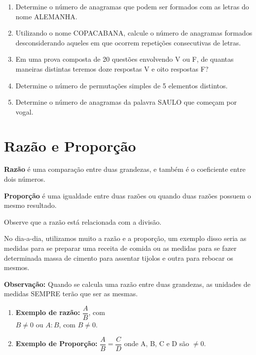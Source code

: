 \begin{multicols*}{2}
\begin{enumerate}
        \item Determine o número de anagramas que podem ser formados com as letras do nome ALEMANHA.

        \item Utilizando o nome COPACABANA, calcule o número de anagramas formados desconsiderando aqueles em que ocorrem repetições consecutivas de letras.

        \item Em uma prova composta de 20 questões envolvendo V ou F, de quantas maneiras distintas teremos doze respostas V e oito respostas F?

        \item Determine o número de permutações simples de 5 elementos distintos.

        \item Determine o número de anagramas da palavra SAULO que começam por vogal.

    \end{enumerate}

    \section*{Razão e Proporção}

    \textbf{Razão} é uma comparação entre duas grandezas, e também é o coeficiente entre dois números.

    \textbf{Proporção} é uma igualdade entre duas razões ou quando duas razões possuem o mesmo resultado.

    Observe que a razão está relacionada com a divisão.

    No dia-a-dia, utilizamos muito a razão e a proporção, um exemplo disso seria as medidas para se preparar uma receita de comida ou as medidas para se fazer determinada massa de cimento para assentar tijolos e outra para rebocar os mesmos.

    \textbf{Observação:} Quando se calcula uma razão entre duas grandezas, as unidades de medidas SEMPRE terão que ser as mesmas.

    \begin{enumerate}

        \item \textbf{Exemplo de razão:}  $ \dfrac{A}{B} $, com\\

              $B \neq 0 $	 ou $ A : B $, com $ B \neq 0 $.

        \item \textbf{Exemplo de Proporção:} $ \dfrac{A}{B} = \dfrac{C}{D} $	onde A, B, C e D são $\neq 0$.


\end{enumerate}
\end{multicols*}
